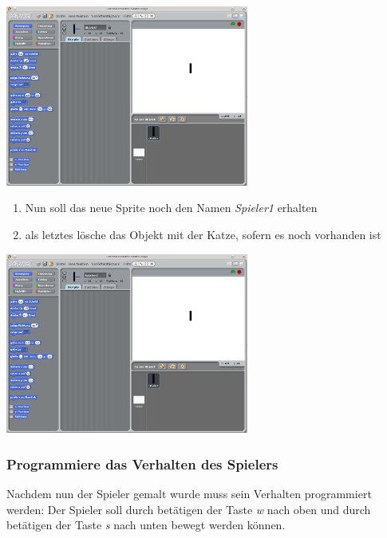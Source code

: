 \includegraphics[width=0.6\textwidth]{images/aufgabe5_pong_sprite_spieler1_1.png}
\begin{enumerate}\addtocounter{enumi}{6}
\item Nun soll das neue Sprite noch den Namen \emph{Spieler1} erhalten
\item als letztes lösche das Objekt mit der Katze, sofern es noch vorhanden ist
\end{enumerate}
\includegraphics[width=0.6\textwidth]{images/aufgabe5_pong_sprite_spieler1_2.png}

\subsubsection{Programmiere das Verhalten des Spielers}

Nachdem nun der Spieler gemalt wurde muss sein Verhalten programmiert werden: Der Spieler soll durch betätigen der Taste \emph{w} nach oben und durch betätigen der Taste \emph{s} nach unten bewegt werden können.


